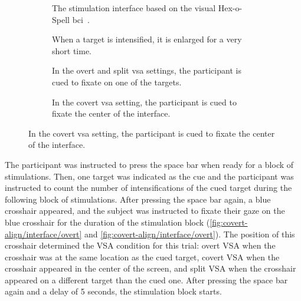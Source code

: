 \begin{figure}
  \begin{subfigure}[t]{.45\textwidth}
    
    \caption[The stimulation interface.]{The stimulation interface based on the visual Hex-o-Spell
    \acs{bci}~\cite{Treder2010}.}
    \label{fig:covert-align/interface/interface}
  \end{subfigure}\hfill%
  \begin{subfigure}[t]{.45\textwidth}
    
    \caption[Intensification.]{When a target is intensified, it is enlarged for
    a very short time.}
    \label{fig:covert-align/interface/intensification}
  \end{subfigure}

  \begin{subfigure}[t]{.45\textwidth}
    
    \caption[Gaze fixated on a target.]{In the overt and split \ac{vsa}
    settings, the
    participant is cued to fixate on one of the targets.}
    \label{fig:covert-align/interface/overt}
  \end{subfigure}\hfill%
  \begin{subfigure}[t]{.45\textwidth}
    
    \caption[Gaze fixated centrally]{In the covert \ac{vsa} setting, the participant is
    cued to fixate the center of the interface.}
    \label{fig:covert-align/interface/covert}
  \end{subfigure}
\end{figure}

The participant was instructed to press the space bar when ready for a block
of stimulations.
Then, one target was indicated as the cue and the participant
was instructed to count the number of intensifications of the cued target
during the following block of stimulations.
After pressing the space bar again, a blue crosshair appeared, and the subject
was instructed to fixate their gaze on the blue crosshair for the duration of
the stimulation block (\autoref{fig:covert-align/interface/overt} and
\autoref{fig:covert-align/interface/overt}).
The position of this crosshair determined the VSA condition for this trial:
overt VSA when the crosshair was at the same location as the cued target,
covert VSA when the crosshair appeared in the center of the screen, and split
VSA when the crosshair appeared on a different target than the cued one.
After pressing the space bar again and a delay of 5 seconds, the stimulation block
starts.

